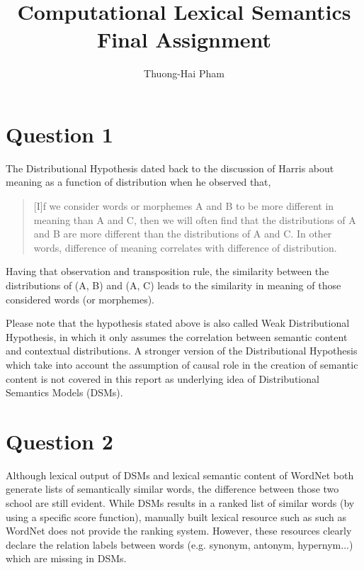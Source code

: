 \documentclass[12pt]{article}
\title{Computational Lexical Semantics \\Final Assignment}
\author{Thuong-Hai Pham}
\begin{document}
\maketitle

\section{Question 1}

The Distributional Hypothesis dated back to the discussion of Harris \cite{harris1954distributional} about meaning as a function of distribution when he observed that,
\blockquote{[I]f we consider words or
	morphemes A and B to be more different in meaning than A and C, then we will
	often find that the distributions of A and B are more different than the distributions of A and C. In other words, difference of meaning correlates with difference
	of distribution.}
Having that observation and transposition rule, the similarity between the distributions of (A, B) and (A, C) leads to the similarity in meaning of those considered words (or morphemes).

Please note that the hypothesis stated above is also called Weak Distributional Hypothesis, in which it only assumes the correlation between semantic content and contextual distributions. A stronger version of the Distributional Hypothesis which take into account the assumption of causal role in the creation of semantic content is not covered in this report as underlying idea of Distributional Semantics Models (DSMs).

\section{Question 2}
Although lexical output of DSMs and lexical semantic content of WordNet both generate lists of semantically similar words, the difference between those two school are still evident. While DSMs results in a ranked list of similar words (by using a specific score function), manually built lexical resource such as such as WordNet does not provide the ranking system. However, these resources clearly declare the relation labels between words (e.g. synonym, antonym, hypernym...) which are missing in DSMs.
\end{document}
